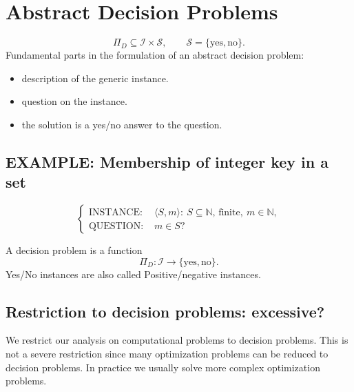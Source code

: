 
\section{Abstract Decision Problems}
\begin{notesdefinition}
\[
\Pi_D\subseteq\mathcal I\times\mathcal S,\qquad\mathcal S=\{\mathrm{yes},\mathrm{no}\}.
\]
Fundamental parts in the formulation of an abstract decision problem:
\begin{itemize}
\item description of the generic instance.
\item question on the instance.
\item the solution is a yes/no answer to the question.
\end{itemize}
\end{notesdefinition}

\subsection{EXAMPLE: Membership of integer key in a set}

\[
\left\{\begin{aligned}
\text{INSTANCE: }&\langle S,m\rangle:\ S\subseteq\mathbb N\text{, finite},\ m\in\mathbb N,\\
\text{QUESTION: }&m\in S?
\end{aligned}\right.
\]
 
A decision problem is a function
\[
\Pi_D:\mathcal I\longrightarrow\{\mathrm{yes},\mathrm{no}\}.
\]
Yes/No instances are also called Positive/negative instances.

\subsection{Restriction to decision problems: excessive?}
We restrict our analysis on computational problems to decision problems. This is not a severe restriction since many optimization problems can be reduced to decision problems.
In practice we usually solve more complex optimization problems.
